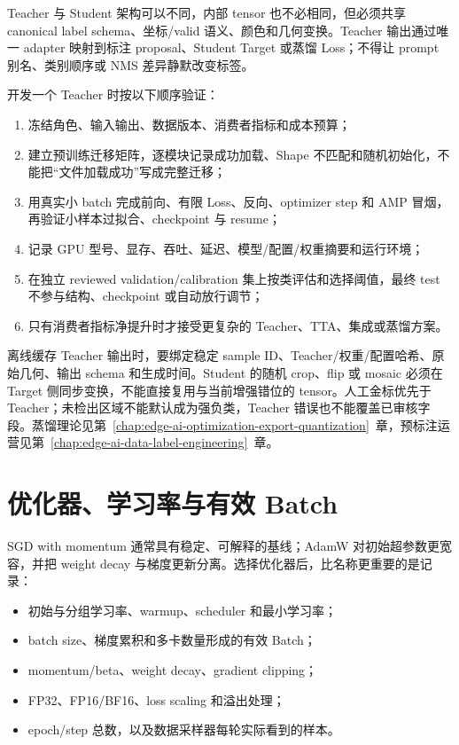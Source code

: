 Teacher 与 Student 架构可以不同，内部 tensor 也不必相同，但必须共享 canonical label schema、坐标/valid 语义、颜色和几何变换。Teacher 输出通过唯一 adapter 映射到标注 proposal、Student Target 或蒸馏 Loss；不得让 prompt 别名、类别顺序或 NMS 差异静默改变标签。

开发一个 Teacher 时按以下顺序验证：

\begin{enumerate}
  \item 冻结角色、输入输出、数据版本、消费者指标和成本预算；
  \item 建立预训练迁移矩阵，逐模块记录成功加载、Shape 不匹配和随机初始化，不能把“文件加载成功”写成完整迁移；
  \item 用真实小 batch 完成前向、有限 Loss、反向、optimizer step 和 AMP 冒烟，再验证小样本过拟合、checkpoint 与 resume；
  \item 记录 GPU 型号、显存、吞吐、延迟、模型/配置/权重摘要和运行环境；
  \item 在独立 reviewed validation/calibration 集上按类评估和选择阈值，最终 test 不参与结构、checkpoint 或自动放行调节；
  \item 只有消费者指标净提升时才接受更复杂的 Teacher、TTA、集成或蒸馏方案。
\end{enumerate}

离线缓存 Teacher 输出时，要绑定稳定 sample ID、Teacher/权重/配置哈希、原始几何、输出 schema 和生成时间。Student 的随机 crop、flip 或 mosaic 必须在 Target 侧同步变换，不能直接复用与当前增强错位的 tensor。人工金标优先于 Teacher；未检出区域不能默认成为强负类，Teacher 错误也不能覆盖已审核字段。蒸馏理论见第~\ref{chap:edge-ai-optimization-export-quantization}~章，预标注运营见第~\ref{chap:edge-ai-data-label-engineering}~章。

\section{优化器、学习率与有效 Batch}

SGD with momentum 通常具有稳定、可解释的基线；AdamW 对初始超参数更宽容，并把 weight decay 与梯度更新分离。选择优化器后，比名称更重要的是记录：

\begin{itemize}
  \item 初始与分组学习率、warmup、scheduler 和最小学习率；
  \item batch size、梯度累积和多卡数量形成的有效 Batch；
  \item momentum/beta、weight decay、gradient clipping；
  \item FP32、FP16/BF16、loss scaling 和溢出处理；
  \item epoch/step 总数，以及数据采样器每轮实际看到的样本。
\end{itemize}

